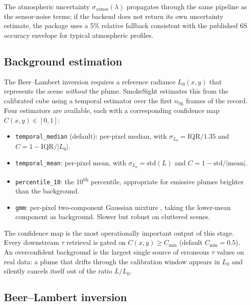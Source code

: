 \documentclass[11pt, a4paper]{article}
\begin{document}
The atmospheric uncertainty $\sigma_\text{atmos}(\lambda)$ propagates
through the same pipeline as the sensor-noise terms; if the backend
does not return its own uncertainty estimate, the package uses a 5\%
relative fallback consistent with the published 6S accuracy envelope
for typical atmospheric profiles.

\subsection{Background estimation}
\label{sec:background}

The Beer--Lambert inversion requires a reference radiance $L_0(x, y)$
that represents the scene \emph{without} the plume. SmokeSight estimates
this from the calibrated cube using a temporal estimator over the first
$n_\text{bg}$ frames of the record. Four estimators are available, each
with a corresponding confidence map $C(x, y) \in [0, 1]$:
\begin{itemize}
  \item \texttt{temporal\_median} (default): per-pixel median, with
        $\sigma_{L_0} = \mathrm{IQR} / 1.35$ and
        $C = 1 - \mathrm{IQR} / |L_0|$.
  \item \texttt{temporal\_mean}: per-pixel mean, with
        $\sigma_{L_0} = \mathrm{std}(L)$ and
        $C = 1 - \mathrm{std} / |\mathrm{mean}|$.
  \item \texttt{percentile\_10}: the 10\textsuperscript{th} percentile,
        appropriate for emissive plumes brighter than the background.
  \item \texttt{gmm}: per-pixel two-component Gaussian mixture
        \cite{pedregosa2011scikit}, taking the lower-mean component as
        background. Slower but robust on cluttered scenes.
\end{itemize}

The confidence map is the most operationally important output of this
stage. Every downstream $\tau$ retrieval is gated on
$C(x, y) \geq C_\text{min}$ (default $C_\text{min} = 0.5$).
An overconfident background is the largest single source of erroneous
$\tau$ values on real data: a plume that drifts through the calibration
window appears in $L_0$ and silently cancels itself out of the ratio
$L / L_0$.

\subsection{Beer--Lambert inversion}
\label{sec:retrieve}
\end{document}
